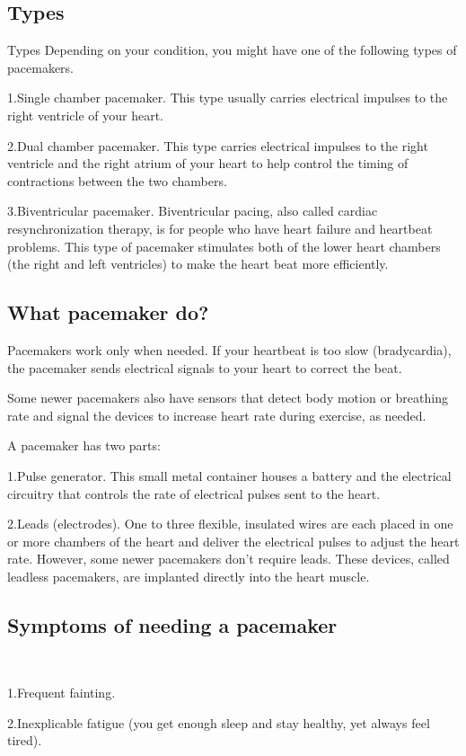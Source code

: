 \documentclass[12pt]{report}
\begin{document}
\subsection{Types}
Types
Depending on your condition, you might have one of the following types of pacemakers.

1.Single chamber pacemaker. This type usually carries electrical impulses to the right ventricle of your heart.\

2.Dual chamber pacemaker. This type carries electrical impulses to the right ventricle and the right atrium of your heart to help control the timing of contractions between the two chambers.\

3.Biventricular pacemaker. Biventricular pacing, also called cardiac resynchronization therapy, is for people who have heart failure and heartbeat problems. This type of pacemaker stimulates both of the lower heart chambers (the right and left ventricles) to make the heart beat more efficiently.\


\subsection{What pacemaker do?}
Pacemakers work only when needed. If your heartbeat is too slow (bradycardia), the pacemaker sends electrical signals to your heart to correct the beat.

Some newer pacemakers also have sensors that detect body motion or breathing rate and signal the devices to increase heart rate during exercise, as needed.

A pacemaker has two parts:

1.Pulse generator. This small metal container houses a battery and the electrical circuitry that controls the rate of electrical pulses sent to the heart.\

2.Leads (electrodes). One to three flexible, insulated wires are each placed in one or more chambers of the heart and deliver the electrical pulses to adjust the heart rate. However, some newer pacemakers don't require leads. These devices, called leadless pacemakers, are implanted directly into the heart muscle.

\subsection{Symptoms of needing a pacemaker}\

1.Frequent fainting.\

2.Inexplicable fatigue (you get enough sleep and stay healthy, yet always feel tired).\
\end{document}
